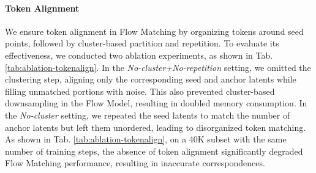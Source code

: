\paragraph{Token Alignment}
We ensure token alignment in Flow Matching by organizing tokens around seed points, followed by  cluster-based partition and repetition. To evaluate its effectiveness, we conducted two ablation experiments, as shown in Tab. \ref{tab:ablation-tokenalign}. In the \textit{No-cluster+No-repetition} setting, we omitted the clustering step, aligning only the corresponding seed and anchor latents while filling unmatched portions with noise. This also prevented cluster-based downsampling in the Flow Model, resulting in doubled memory consumption. In the \textit{No-cluster} setting, we repeated the seed latents to match the number of anchor latents but left them unordered, leading to disorganized token matching. As shown in Tab. \ref{tab:ablation-tokenalign}, on a 40K subset with the same number of training steps, the absence of token alignment significantly degraded Flow Matching performance, resulting in inaccurate correspondences.



